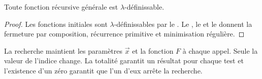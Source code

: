 \documentclass[../../../include/open-logic-section]{subfiles}
\begin{document}
\begin{prop}
Toute fonction récursive générale
est $\lambda$-définissable.
\end{prop}

\begin{proof}
Les fonctions initiales sont
$\lambda$-définissables par le
.
Le ,
le  et le
 donnent la fermeture
par composition, récurrence primitive
et minimisation régulière.
\end{proof}

La recherche maintient les paramètres $\vec x$ et la fonction
$F$ à chaque appel. Seule la valeur de l'indice change.
La totalité garantit un résultat pour chaque test et
l'existence d'un zéro garantit que l'un d'eux arrête la recherche.
\end{document}
